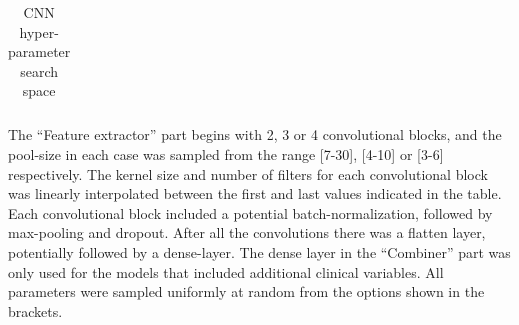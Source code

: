 \documentclass[preprint]{elsarticle}
\begin{document}
\begin{table}[H]
\begin{adjustbox}{center}
\begin{tabular}{@{}lr@{}}
\bottomrule
\end{tabular}
\end{adjustbox}
\caption{CNN hyper-parameter search space}
\medskip
\small
The ``Feature extractor'' part begins with 2, 3 or 4 convolutional blocks, and the pool-size in each case was sampled from the range [7-30], [4-10] or [3-6] respectively. The kernel size and number of filters for each convolutional block was linearly interpolated between the first and last values indicated in the table. Each convolutional block included a potential batch-normalization, followed by max-pooling and dropout. After all the convolutions there was a flatten layer, potentially followed by a dense-layer. The dense layer in the ``Combiner'' part was only used for the models that included additional clinical variables. All parameters were sampled uniformly at random from the options shown in the brackets.
\label{table:cnn}
\end{table}

\end{document}
